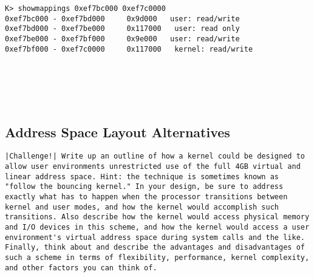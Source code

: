 \documentclass{article}
\begin{document}
\begin{CJK*}{UTF8}{gkai}
\begin{lstlisting}[style=console]
K> showmappings 0xef7bc000 0xef7c0000
0xef7bc000 - 0xef7bd000     0x9d000   user: read/write
0xef7bd000 - 0xef7be000     0x117000   user: read only
0xef7be000 - 0xef7bf000     0x9e000   user: read/write
0xef7bf000 - 0xef7c0000     0x117000   kernel: read/write

\end{lstlisting}

\begin{lstlisting}[style=console]
\end{lstlisting}

\begin{lstlisting}[style=console]
\end{lstlisting}
\begin{lstlisting}[style=console]
\end{lstlisting}

\begin{lstlisting}[style=console]
\end{lstlisting}
\begin{lstlisting}[style=console]
\end{lstlisting}

\begin{lstlisting}[style=console]
\end{lstlisting}
\subsection{Address Space Layout Alternatives}

\begin{lstlisting}[style=challenge]
|Challenge!| Write up an outline of how a kernel could be designed to allow user environments unrestricted use of the full 4GB virtual and linear address space. Hint: the technique is sometimes known as "follow the bouncing kernel." In your design, be sure to address exactly what has to happen when the processor transitions between kernel and user modes, and how the kernel would accomplish such transitions. Also describe how the kernel would access physical memory and I/O devices in this scheme, and how the kernel would access a user environment's virtual address space during system calls and the like. Finally, think about and describe the advantages and disadvantages of such a scheme in terms of flexibility, performance, kernel complexity, and other factors you can think of.
\end{lstlisting}


\end{CJK*}
\end{document}
